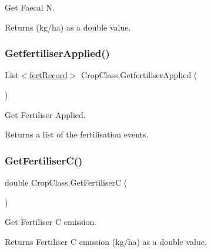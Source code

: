 Get Faecal N. 

\begin{DoxyReturn}{Returns}
(kg/ha) as a double value. 
\end{DoxyReturn}
\mbox{\label{class_crop_class_af0455a67b05e1ff2679f0f37062dc2e8}} 
\subsubsection{\texorpdfstring{GetfertiliserApplied()}{GetfertiliserApplied()}}
{\footnotesize\ttfamily List$<$\mbox{\hyperlink{classfert_record}{fert\+Record}}$>$ Crop\+Class.\+Getfertiliser\+Applied (\begin{DoxyParamCaption}{ }\end{DoxyParamCaption})\hspace{0.3cm}{\ttfamily [inline]}}



Get Fertiliser Applied. 

\begin{DoxyReturn}{Returns}
a list of the fertilisation events. 
\end{DoxyReturn}
\mbox{\label{class_crop_class_a323d6d6e84c6c6648dafc2add80fa343}} 
\subsubsection{\texorpdfstring{GetFertiliserC()}{GetFertiliserC()}}
{\footnotesize\ttfamily double Crop\+Class.\+Get\+FertiliserC (\begin{DoxyParamCaption}{ }\end{DoxyParamCaption})\hspace{0.3cm}{\ttfamily [inline]}}



Get Fertiliser C emission. 

\begin{DoxyReturn}{Returns}
Fertiliser C emission (kg/ha) as a double value. 
\end{DoxyReturn}
\mbox{\label{class_crop_class_ac28ed49f8a4893ef18af0f01a841d629}} 
